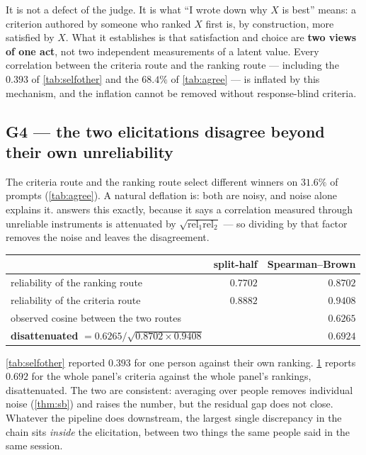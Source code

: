  It is not a defect of the judge. It is
what ``I wrote down why $X$ is best'' means: a criterion authored by someone who
ranked $X$ first is, by construction, more satisfied by $X$. What it establishes
is that satisfaction and choice are \textbf{two views of one act}, not two
independent measurements of a latent value. Every correlation between the
criteria route and the ranking route --- including the $0.393$ of
\cref{tab:selfother} and the $68.4\%$ of \cref{tab:agree} --- is inflated by this
mechanism, and the inflation cannot be removed without response-blind criteria.

\subsection{G4 --- the two elicitations disagree beyond their own unreliability}

The criteria route and the ranking route select different winners on $31.6\%$ of
prompts (\cref{tab:agree}). A natural deflation is: both are noisy, and noise
alone explains it.  answers this exactly, because it says a
correlation measured through unreliable instruments is attenuated by
$\sqrt{\mathrm{rel}_1\mathrm{rel}_2}$ --- so dividing by that factor removes the
noise and leaves the disagreement.

\begin{table}[H]\centering\small
\begin{tabular}{lrr}
\toprule
& split-half & Spearman--Brown\\
\midrule
reliability of the ranking route & $0.7702$ & $0.8702$\\
reliability of the criteria route & $0.8882$ & $0.9408$\\
\midrule
observed cosine between the two routes & & $0.6265$\\
\textbf{disattenuated} $=0.6265/\sqrt{0.8702\times0.9408}$ & & $\mathbf{0.6924}$\\
\bottomrule
\end{tabular}
\label{tab:disatten}
\end{table}


\begin{corollary}
\cref{tab:selfother} reported $0.393$ for one person against their own ranking.
\cref{tab:disatten} reports $0.692$ for the whole panel's criteria against the
whole panel's rankings, disattenuated. The two are consistent: averaging over
people removes individual noise (\cref{thm:sb}) and raises the number, but the
residual gap does not close. Whatever the pipeline does downstream, the largest single
discrepancy in the chain sits \emph{inside} the elicitation, between two things
the same people said in the same session.
\end{corollary}
